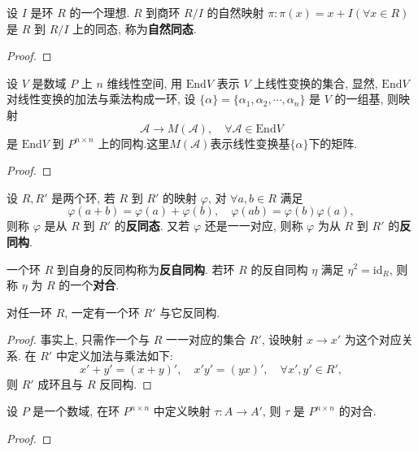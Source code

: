 \documentclass[../../main.tex]{subfiles}
\begin{document}
\begin{example}
设 \( I \) 是环 \( R \) 的一个理想. \( R \) 到商环 \( R/I \) 的自然映射 \( \pi: \pi(x) = x + I (\forall x \in R) \) 是 \( R \) 到 \( R/I \) 上的同态, 称为\textbf{自然同态}.
\end{example}
\begin{proof}

\end{proof}

\begin{example}
设 \( V \) 是数域 \( P \) 上 \( n \) 维线性空间, 用 \( \text{End}V \) 表示 \( V \) 上线性变换的集合, 显然, \( \text{End}V \) 对线性变换的加法与乘法构成一环, 设 \( \{\alpha\} = \{\alpha_1, \alpha_2, \cdots, \alpha_n\} \) 是 \( V \) 的一组基, 则映射
\[
\mathcal{A} \to M(\mathcal{A}), \quad \forall \mathcal{A} \in \text{End}V
\]
是 \( \text{End}V \) 到 \( P^{n \times n} \) 上的同构.这里$M(\mathcal{A})$表示线性变换基$\{\alpha\}$下的矩阵.
\end{example}
\begin{proof}

\end{proof}

\begin{definition}
设 \( R, R' \) 是两个环, 若 \( R \) 到 \( R' \) 的映射 \( \varphi \), 对 \( \forall a,b \in R \) 满足
\[
\varphi(a + b) = \varphi(a) + \varphi(b), \quad \varphi(ab) = \varphi(b)\varphi(a),
\]
则称 \( \varphi \) 是从 \( R \) 到 \( R' \) 的\textbf{反同态}. 又若 \( \varphi \) 还是一一对应, 则称 \( \varphi \) 为从 \( R \) 到 \( R' \) 的\textbf{反同构}.

一个环 \( R \) 到自身的反同构称为\textbf{反自同构}. 若环 \( R \) 的反自同构 \( \eta \) 满足 \( \eta^2 = \text{id}_R \), 则称 \( \eta \) 为 \( R \) 的一个\textbf{对合}.
\end{definition}

\begin{theorem}
对任一环 \( R \), 一定有一个环 \( R' \) 与它反同构.
\end{theorem}
\begin{proof}
事实上, 只需作一个与 \( R \) 一一对应的集合 \( R' \), 设映射 \( x \to x' \) 为这个对应关系. 在 \( R' \) 中定义加法与乘法如下:
\[
x' + y' = (x + y)', \quad x'y' = (yx)', \quad \forall x', y' \in R',
\]
则 \( R' \) 成环且与 \( R \) 反同构.
\end{proof}

\begin{example}
设 \( P \) 是一个数域, 在环 \( P^{n \times n} \) 中定义映射 \( \tau: A \to A' \), 则 \( \tau \) 是 \( P^{n \times n} \) 的对合.
\end{example}
\begin{proof}

\end{proof}
\end{document}
